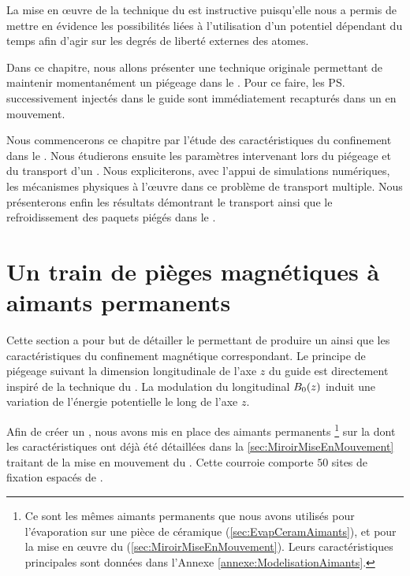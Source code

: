 La mise en \oe uvre de la technique du \mimamo est instructive puisqu'elle nous a permis de mettre en évidence les possibilités liées à l'utilisation d'un potentiel dépendant du temps afin d'agir sur les degrés de liberté externes des atomes.

Dans ce chapitre, nous allons présenter une technique originale permettant de maintenir momentanément un piégeage \td dans le \gm. Pour ce faire, les \ps successivement injectés dans le guide sont immédiatement recapturés dans un \tpm en mouvement. 

Nous commencerons ce chapitre par l'étude des caractéristiques du confinement dans le \tp. Nous étudierons ensuite les paramètres intervenant lors du piégeage et du transport d'un \pat. Nous expliciterons, avec l'appui de simulations numériques, les mécanismes physiques à l'\oe uvre dans ce problème de transport multiple. 
Nous présenterons enfin les résultats démontrant le transport ainsi que le refroidissement des paquets piégés dans le \tpm.


\section{Un train de pièges magnétiques à aimants permanents}\label{sec:ConvTrainAimants}

Cette section a pour but de détailler le \setup permettant de produire un \tp ainsi que les caractéristiques du confinement magnétique correspondant. 
Le principe de piégeage suivant la dimension longitudinale de l'axe $z$ du guide est directement inspiré de la technique du \mima. La modulation du \chm longitudinal ${B_0}(z)$ induit une variation de l'énergie potentielle le long de l'axe $z$. 



Afin de créer un \tp, nous avons mis en place des aimants permanents%
%
\footnote{Ce sont les mêmes aimants permanents que nous avons utilisés pour l'évaporation sur une pièce de céramique (\autoref{sec:EvapCeramAimants}), et pour la mise en \oe uvre du \mimamo (\autoref{sec:MiroirMiseEnMouvement}). Leurs caractéristiques principales sont données dans l'Annexe \ref{annexe:ModelisationAimants}.}
%
sur la \couconv dont les caractéristiques ont déjà été détaillées dans la \autoref{sec:MiroirMiseEnMouvement} traitant de la mise en mouvement du \mimamo. Cette courroie comporte $50$ sites de fixation espacés de . 

